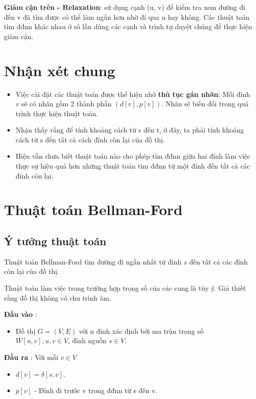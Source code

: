 \documentclass[../main-report.tex]{subfiles}
\begin{document}
\textbf{Giảm cận trên - Relaxation}: sử dụng cạnh (u, v) để kiểm tra xem đường đi đến v đã tìm được có thể làm ngắn hơn nhờ đi qua u hay không. 
Các thuật toán tìm đđnn khác nhau ở số lần dùng các cạnh và trình tự duyệt chúng để thực hiện giảm cận.

\section*{Nhận xét chung}
\begin{itemize}
    \item Việc cài đặt các thuật toán được thể hiện nhờ \textbf{thủ tục gán nhãn}: Mỗi đỉnh $v$ sẽ có nhãn gồm 2 thành phần $(d[v], p[v])$. Nhãn sẽ biến đổi trong quá trình thực hiện thuật toán.
    \item Nhận thấy rằng để tính khoảng cách từ s đến t, ở đây, ta phải tính khoảng cách từ s đến tất cả cách đỉnh còn lại của đồ thị.
    \item Hiện vẫn chưa biết thuật toán nào cho phép tìm đđnn giữa hai đỉnh làm việc thực sự hiệu quả hơn những thuật toán tìm đđnn từ một đỉnh đến tất cả các đỉnh còn lại.
\end{itemize}

\section{Thuật toán Bellman-Ford}
\subsection{Ý tưởng thuật toán}
Thuật toán Bellman-Ford tìm đường đi ngắn nhất từ đỉnh $s$ đến tất cả các đỉnh còn lại của đồ thị.

Thuật toán làm việc trong trường hợp trọng số của các cung là tùy ý. Giả thiết rằng đồ thị không có chu trình âm.

\textbf{Đầu vào} : 
\begin{itemize}
\item Đồ thị $G = (V, E)$ với n đỉnh xác định bởi ma trận trọng số $W[u, v], u,v \in V$, đỉnh nguồn $s \in V$.
\end{itemize}

\textbf{Đầu ra} : Với mỗi $v \in V$
\begin{itemize}
\item $d[v] = \delta[s, v]$.
\item $p[v]$ - Đỉnh đi trước v trong đđnn từ s đến v.
\end{itemize}
\end{document}

